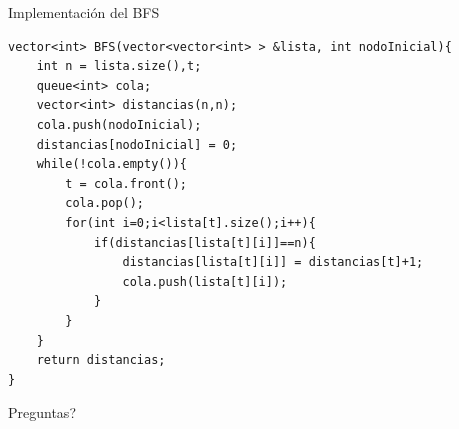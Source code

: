 \documentclass[compress]{beamer}
\begin{document}
\begin{frame}[fragile]{Implementaci\'on del BFS}
\begin{lstlisting}
vector<int> BFS(vector<vector<int> > &lista, int nodoInicial){
    int n = lista.size(),t;
    queue<int> cola;
    vector<int> distancias(n,n);
    cola.push(nodoInicial);
    distancias[nodoInicial] = 0;
    while(!cola.empty()){
        t = cola.front();
        cola.pop();
        for(int i=0;i<lista[t].size();i++){
            if(distancias[lista[t][i]]==n){
                distancias[lista[t][i]] = distancias[t]+1;
                cola.push(lista[t][i]);
            }
        }
    }
    return distancias;
}
\end{lstlisting}
\end{frame}


\begin{frame}
\begin{center}
{\Huge \textquestiondown Preguntas?}
\end{center}
\end{frame}
\end{document}
